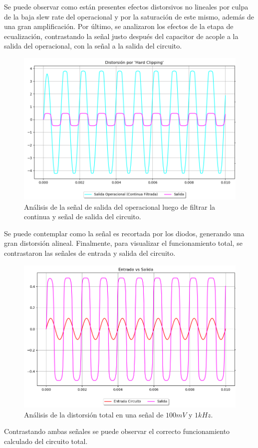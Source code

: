 Se puede observar como están presentes efectos distorsivos no lineales por culpa de la baja slew rate del operacional y por la saturación de este mismo, además de una gran amplificación.
Por último, se analizaron los efectos de la etapa de ecualización, contrastando la señal justo después del capacitor de acople a la salida del operacional, con la señal a la salida del circuito.

\begin{figure}[H]
	\centering
	\includegraphics[width=1\textwidth, trim={0 0 0 0}, clip]{Ejercicio5/Imagenes/Circuito_base/Sim/circuito_base_tran_vclip_vo.png}
	\caption{Análisis de la señal de salida del operacional luego de filtrar la continua y señal de salida del circuito.}
	\label{fig:sim_base}
\end{figure}
Se puede contemplar como la señal es recortada por los diodos, generando una gran distorsión alineal.
Finalmente, para visualizar el funcionamiento total, se contrastaron las señales de entrada y salida del circuito.
\begin{figure}[H]
	\centering
	\includegraphics[width=1\textwidth, trim={0 0 0 0}, clip]{Ejercicio5/Imagenes/Circuito_base/Sim/circuito_base_tran_vi_vo.png}
	\caption{Análisis de la distorsión total en una señal de $100mV$ y $1kHz$.}
	\label{fig:sim_base}
\end{figure}
Contrastando ambas señales se puede observar el correcto funcionamiento calculado del circuito total.
